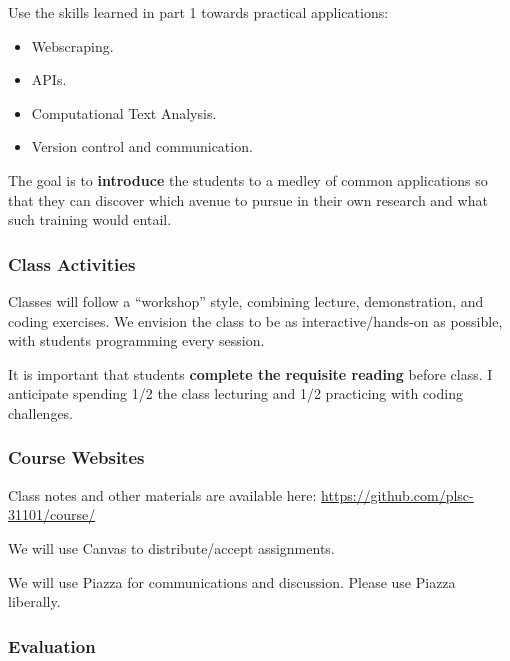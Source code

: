 \documentclass[
]{book}
\providecommand{\tightlist}{%
  \setlength{\itemsep}{0pt}\setlength{\parskip}{0pt}}
\begin{document}
Use the skills learned in part 1 towards practical applications:

\begin{itemize}
\tightlist
\item
  Webscraping.
\item
  APIs.
\item
  Computational Text Analysis.
\item
  Version control and communication.
\end{itemize}

The goal is to \textbf{introduce} the students to a medley of common applications so that they can discover which avenue to pursue in their own research and what such training would entail.

\hypertarget{class-activities}{%
\subsubsection*{Class Activities}\label{class-activities}}

Classes will follow a ``workshop'' style, combining lecture, demonstration, and coding exercises. We envision the class to be as interactive/hands-on as possible, with students programming every session.

It is important that students \textbf{complete the requisite reading} before class. I anticipate spending 1/2 the class lecturing and 1/2 practicing with coding challenges.

\hypertarget{course-websites}{%
\subsubsection*{Course Websites}\label{course-websites}}

Class notes and other materials are available here:
\url{https://github.com/plsc-31101/course/}

We will use Canvas to distribute/accept assignments.

We will use Piazza for communications and discussion. Please use Piazza liberally.

\hypertarget{evaluation}{%
\subsubsection*{Evaluation}\label{evaluation}}
\end{document}
